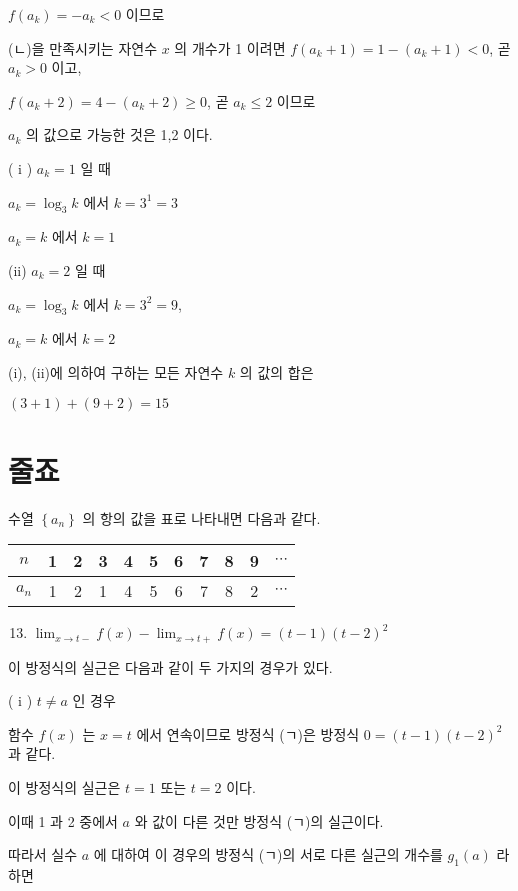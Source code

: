 \documentclass[10pt]{article}
\begin{document}
$f\left(a_{k}\right)=-a_{k}<0$ 이므로

(ㄴ)을 만족시키는 자연수 $x$ 의 개수가 1 이려면 $f\left(a_{k}+1\right)=1-\left(a_{k}+1\right)<0$, 곧 $a_{k}>0$ 이고,

$f\left(a_{k}+2\right)=4-\left(a_{k}+2\right) \geq 0$, 곧 $a_{k} \leq 2$ 이므로

$a_{k}$ 의 값으로 가능한 것은 1,2 이다.

( i ) $a_{k}=1$ 일 때

$a_{k}=\log _{3} k$ 에서 $k=3^{1}=3$

$a_{k}=k$ 에서 $k=1$

(ii) $a_{k}=2$ 일 때

$a_{k}=\log _{3} k$ 에서 $k=3^{2}=9$,

$a_{k}=k$ 에서 $k=2$

(i), (ii)에 의하여 구하는 모든 자연수 $k$ 의 값의 합은

$(3+1)+(9+2)=15$

\section*{줄죠}
수열 $\left\{a_{n}\right\}$ 의 항의 값을 표로 나타내면 다음과 같다.

\begin{center}
\begin{tabular}{|c|c|c|c|c|c|c|c|c|c|c|}
\hline
$n$ & 1 & 2 & 3 & 4 & 5 & 6 & 7 & 8 & 9 & $\cdots$ \\
\hline
$a_{n}$ & 1 & 2 & 1 & 4 & 5 & 6 & 7 & 8 & 2 & $\cdots$ \\
\hline
\end{tabular}
\end{center}

\begin{enumerate}
  \setcounter{enumi}{12}
  \item $\lim _{x \rightarrow t-} f(x)-\lim _{x \rightarrow t+} f(x)=(t-1)(t-2)^{2}$
\end{enumerate}

이 방정식의 실근은 다음과 같이 두 가지의 경우가 있다.

( i ) $t \neq a$ 인 경우

함수 $f(x)$ 는 $x=t$ 에서 연속이므로 방정식 (ㄱ)은 방정식 $0=(t-1)(t-2)^{2}$ 과 같다.

이 방정식의 실근은 $t=1$ 또는 $t=2$ 이다.

이때 1 과 2 중에서 $a$ 와 값이 다른 것만 방정식 (ㄱ)의 실근이다.

따라서 실수 $a$ 에 대하여 이 경우의 방정식 (ㄱ)의 서로 다른 실근의 개수를 $g_{1}(a)$ 라 하면
\end{document}
